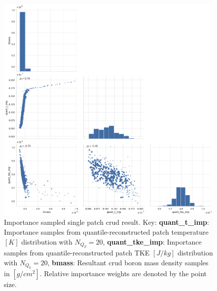 \begin{figure}[H]
    \centering
    \includegraphics[width=0.99\linewidth]{figs/imp_patch/importance_t_tke_bmass_scatter}
    \caption[Importance sampled single patch crud scatter plot result.]{Importance sampled single patch crud result. Key: \textbf{quant\_t\_imp}: Importance samples from quantile-reconstructed patch temperature $[K]$ distribution with $N_{Q_T}=20$,  \textbf{quant\_tke\_imp}: Importance samples from quantile-reconstructed patch TKE $[J/kg]$ distribution with $N_{Q_k}=20$,  \textbf{bmass}:  Resultant crud boron mass density samples in $[g/cm^2]$. Relative importance weights are denoted by the point size.}
    \label{fig:importancettkebmassscatter}
\end{figure}

